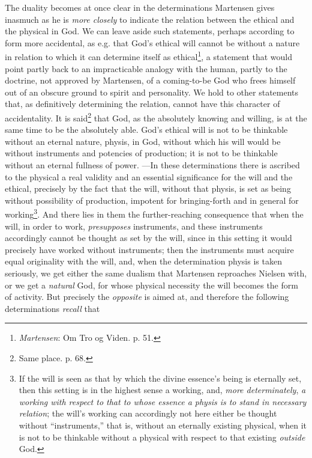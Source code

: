\documentclass[12pt,a4paper]{book}
\begin{document}
The duality becomes at once clear in the determinations Martensen gives inasmuch as he is
\emph{more closely} to indicate the relation between the ethical and the physical in God.
We can leave aside such statements, perhaps according to form more accidental, as e.g.
that God's ethical will cannot be without a nature in relation to which it can determine
itself as ethical\footnote{\emph{Martensen}: Om Tro og Viden. p. 51.}, a statement that would
point partly back to an impracticable analogy with the human, partly to the doctrine, not
approved by Martensen, of a coming-to-be God who frees himself out of an obscure ground to
spirit and personality. We hold to other statements that, as definitively determining the
relation, cannot have this character of accidentality. It is said\footnote{Same place. p.
68.} that God, as the absolutely knowing and willing, is at the same time to be the
absolutely able. God's ethical will is not to be thinkable without an eternal nature,
physis, in God, without which his will would be without instruments and potencies of
production; it is not to be thinkable without an eternal fullness of power. ---In these
determinations there is ascribed to the physical a real validity and an essential
significance for the will and the ethical, precisely by the fact that the will, without
that physis, is set as being without possibility of production, impotent for bringing-forth
and in general for working\footnote{If the will is seen as that by which the divine
essence's being is eternally set, then this setting is in the highest sense a working, and,
\emph{more determinately}, \emph{a working with respect to that to whose essence a physis is to stand in
necessary relation}; the will's working can accordingly not here either be thought without
``instruments,'' that is, without an eternally existing physical, when it is not to be
thinkable without a physical with respect to that existing \emph{outside} God.}. And there lies in
them the further-reaching consequence that when the will, in order to work, \emph{presupposes}
instruments, and these instruments accordingly cannot be thought as set by the will, since
in this setting it would precisely have worked without instruments; then the instruments
must acquire equal originality with the will, and, when the determination physis is taken
seriously, we get either the same dualism that Martensen reproaches Nielsen with, or we get
a \emph{natural} God, for whose physical necessity the will becomes the form of activity. But
precisely the \emph{opposite} is aimed at, and therefore the following determinations \emph{recall} that
\end{document}
